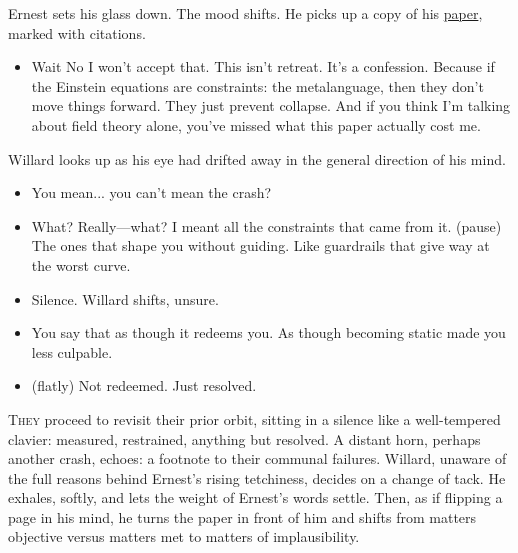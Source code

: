 Ernest sets his glass down. The mood shifts. He picks up a copy of his \href{https://www.researchgate.net/publication/392402161_From_Spinor_Dynamics_to_Gravitational_Constraint_A_Tarskian_Interpretation_of_the_Einstein_Equations}{paper}, marked with citations.

\begin{itemize}[leftmargin=2cm, label={}]
\item[\textbf{Ernest:}]  
Wait No I won't accept that. This isn’t retreat. It’s a confession.  
Because if the Einstein equations are constraints: the metalanguage, then they don’t move things forward. They just prevent collapse.  
And if you think I’m talking about field theory alone, you’ve missed what this paper actually cost me.
\end{itemize}

Willard looks up as his eye had drifted away in the general direction of his mind. 

\begin{itemize}[leftmargin=2cm, label={}]

\item[\textbf{Willard:}]  
You mean... you can't mean the crash?

\item[\textbf{Ernest:}]  
What? Really—what? I meant all the constraints that came from it.  
(pause)  
The ones that shape you without guiding. Like guardrails that give way at the worst curve.
 

\item[]Silence. Willard shifts, unsure.

\item[\textbf{Willard:}]  
You say that as though it redeems you.  
As though becoming static made you less culpable.

\item[\textbf{Ernest:}] (flatly)
Not redeemed. Just resolved. 

\end{itemize}

\lettrine{T}{hey} proceed to revisit their prior orbit, sitting in a silence like a well-tempered clavier: measured, restrained, anything but resolved.  
A distant horn, perhaps another crash, echoes: a footnote to their communal failures.  
Willard, unaware of the full reasons behind Ernest's rising tetchiness, decides on a change of tack.  
He exhales, softly, and lets the weight of Ernest’s words settle. Then, as if flipping a page in his mind, he turns the paper in front of him and shifts from matters objective versus matters met to matters of implausibility.

